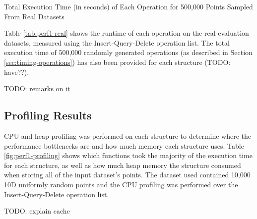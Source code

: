 \begin{table}
	\caption{Total Execution Time (in seconds) of Each Operation for 500,000 Points Sampled From Real Datasets}
	\label{tab:perf1-real}
\end{table}

Table \ref{tab:perf1-real} shows the runtime of each operation on the real evaluation datasets, measured using the Insert-Query-Delete operation list. The total execution time of 500,000 randomly generated operations (as described in Section \ref{sec:timing-operations}) has also been provided for each structure (TODO: have??).

TODO: remarks on it

\subsection{Profiling Results}

CPU and heap profiling was performed on each structure to determine where the performance bottlenecks are and how much memory each structure uses. Table \ref{fig:perf1-profiling} shows which functions took the majority of the execution time for each structure, as well as how much heap memory the structure consumed when storing all of the input dataset's points. The dataset used contained 10,000 10D uniformly random points and the CPU profiling was performed over the Insert-Query-Delete operation list.

TODO: explain cache

\begin{table}
	\centering
	\caption{CPU and Heap Profiling Statistics for Insert-Query Delete Operation List with 500,000 Points from 16D Synthetic Dataset}
	\label{tab:perf1-profiling}
\end{table}

